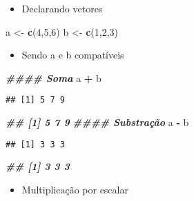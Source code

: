 \documentclass[
]{article}
\newenvironment{Shaded}{\begin{snugshade}}{\end{snugshade}}
\newcommand{\DecValTok}[1]{\textcolor[rgb]{0.00,0.00,0.81}{#1}}
\newcommand{\DocumentationTok}[1]{\textcolor[rgb]{0.56,0.35,0.01}{\textbf{\textit{#1}}}}
\newcommand{\FunctionTok}[1]{\textcolor[rgb]{0.13,0.29,0.53}{\textbf{#1}}}
\newcommand{\NormalTok}[1]{#1}
\newcommand{\OtherTok}[1]{\textcolor[rgb]{0.56,0.35,0.01}{#1}}
\newcommand{\SpecialCharTok}[1]{\textcolor[rgb]{0.81,0.36,0.00}{\textbf{#1}}}
\providecommand{\tightlist}{%
  \setlength{\itemsep}{0pt}\setlength{\parskip}{0pt}}
\begin{document}
\begin{itemize}
\tightlist
\item
  Declarando vetores
\end{itemize}

\begin{Shaded}
\begin{Highlighting}[]
\NormalTok{a }\OtherTok{\textless{}{-}} \FunctionTok{c}\NormalTok{(}\DecValTok{4}\NormalTok{,}\DecValTok{5}\NormalTok{,}\DecValTok{6}\NormalTok{)}
\NormalTok{b }\OtherTok{\textless{}{-}} \FunctionTok{c}\NormalTok{(}\DecValTok{1}\NormalTok{,}\DecValTok{2}\NormalTok{,}\DecValTok{3}\NormalTok{)}
\end{Highlighting}
\end{Shaded}

\begin{itemize}
\tightlist
\item
  Sendo a e b compatíveis
\end{itemize}

\begin{Shaded}
\begin{Highlighting}[]
\DocumentationTok{\#\#\#\# Soma}
\NormalTok{a }\SpecialCharTok{+}\NormalTok{ b}
\end{Highlighting}
\end{Shaded}

\begin{verbatim}
## [1] 5 7 9
\end{verbatim}

\begin{Shaded}
\begin{Highlighting}[]
\DocumentationTok{\#\# [1] 5 7 9}
\DocumentationTok{\#\#\#\# Substração}
\NormalTok{a }\SpecialCharTok{{-}}\NormalTok{ b}
\end{Highlighting}
\end{Shaded}

\begin{verbatim}
## [1] 3 3 3
\end{verbatim}

\begin{Shaded}
\begin{Highlighting}[]
\DocumentationTok{\#\# [1] 3 3 3}
\end{Highlighting}
\end{Shaded}

\begin{itemize}
\tightlist
\item
  Multiplicação por escalar
\end{itemize}
\end{document}
